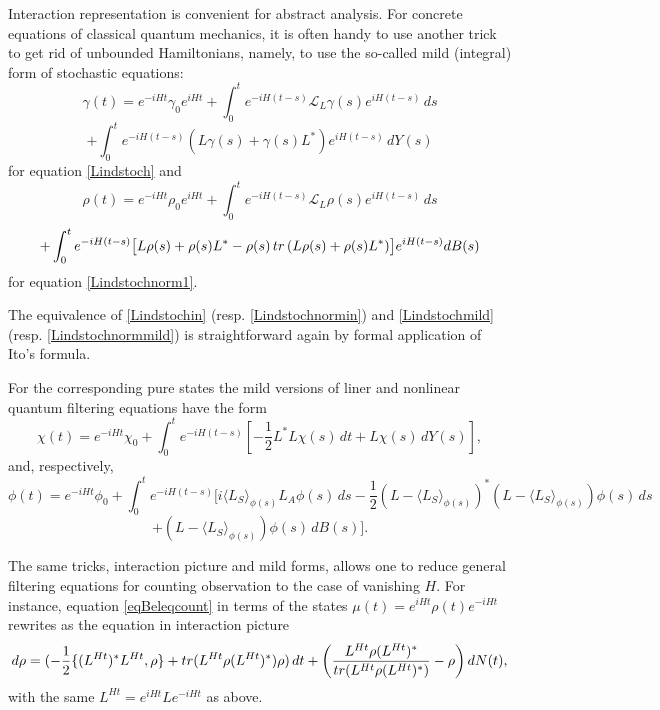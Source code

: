 \documentclass[10pt,a4paper]{amsart}
\def\LC{\mathcal{L}}
\def\tr{\rm{tr}}
\def\ga{\gamma}
\begin{document}
Interaction representation is convenient for abstract analysis. For concrete equations
of classical quantum mechanics, it is often handy to use another trick to get rid of unbounded
Hamiltonians, namely, to use the so-called mild (integral) form of stochastic equations:
\[
\ga(t)=e^{-iHt}\ga_0e^{iHt}
+\int_0^t e^{-iH(t-s)} \LC_L\ga (s)  e^{iH(t-s)} \, ds
\]
\begin{equation}
\label{Lindstochmild}
 +\int_0^t e^{-iH(t-s)} (L\ga(s)+\ga(s) L^*) e^{iH(t-s)}\, dY(s)
\end{equation}
for equation \eqref{Lindstoch} and
\[
\rho(t)=e^{-iHt}\rho_0 e^{iHt}
+\int_0^t e^{-iH(t-s)} \LC_L\rho (s)  e^{iH(t-s)} \, ds
\]
\begin{equation}
\label{Lindstochnormmild}
+\int_0^t e^{-iH(t-s)} \bigl[
L\rho(s)+\rho(s) L^*-\rho(s)\, {\tr} \, (L\rho(s)+\rho(s) L^*) \bigr] e^{iH(t-s)} dB(s)
\end{equation}
for equation \eqref{Lindstochnorm1}.

The equivalence of \eqref{Lindstochin} (resp. \eqref{Lindstochnormin}) and \eqref{Lindstochmild}
(resp. \eqref{Lindstochnormmild}) is straightforward again by formal application of Ito's formula.

For the corresponding pure states the mild versions
 of liner and nonlinear quantum filtering equations have the form
\begin{equation}
\label{eqqufiBlinsm}
\chi(t) =e^{-iH t}\chi_0+\int_0^t e^{-iH(t-s)} [-\frac12 L^*L \chi(s) \,dt+L \chi(s) \, dY(s)],
\end{equation}
and, respectively,
\[
\phi(t)=e^{-iH t}\phi_0+\int_0^t e^{-iH (t-s)} \bigl[ i\langle L_S \rangle_{\phi(s)} L_A \phi(s) \, ds
-\frac12 (L-\langle L_S \rangle_{\phi(s)})^*(L-\langle L_S \rangle_{\phi(s)})\phi(s) \, ds
\]
\begin{equation}
\label{eqqufiBnonlinsm}
+ (L-\langle L_S \rangle_{\phi(s)})\phi(s) \, dB(s)\bigr].
\end{equation}

The same tricks, interaction picture and mild forms,
allows one to reduce general filtering equations for counting observation
to the case of vanishing $H$. For instance, equation \eqref{eqBeleqcount} in terms of the states
$\mu(t)=e^{iHt}\rho(t) e^{-iHt}$ rewrites as the equation in interaction picture
 \begin{equation}
\label{eqBeleqcountin}
d\rho=(-\frac12 \{(L^{Ht})^*L^{Ht},\rho\}+ {\tr} (L^{Ht}\rho (L^{Ht})^*) \rho ) \, dt
+\left(\frac{L^{Ht}\rho (L^{Ht})^*}{{\tr} (L^{Ht}\rho (L^{Ht})^*)}-\rho\right) dN(t),
\end{equation}
with the same $L^{Ht}=e^{iHt} L e^{-iHt}$ as above.
\end{document}
